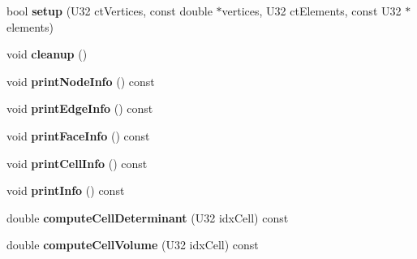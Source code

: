 \begin{DoxyCompactItemize}
\item 
\hypertarget{classps_1_1elastic_1_1VolMesh_a22ec69f1fafb6470f4c86077aa785edc}{}bool {\bfseries setup} (U32 ct\+Vertices, const double $\ast$vertices, U32 ct\+Elements, const U32 $\ast$elements)\label{classps_1_1elastic_1_1VolMesh_a22ec69f1fafb6470f4c86077aa785edc}

\item 
\hypertarget{classps_1_1elastic_1_1VolMesh_ab5e7fad7fda1a51dc0e4f304dd4aa0ce}{}void {\bfseries cleanup} ()\label{classps_1_1elastic_1_1VolMesh_ab5e7fad7fda1a51dc0e4f304dd4aa0ce}

\item 
\hypertarget{classps_1_1elastic_1_1VolMesh_af749229a655b38582d9028c3cfbf394d}{}void {\bfseries print\+Node\+Info} () const \label{classps_1_1elastic_1_1VolMesh_af749229a655b38582d9028c3cfbf394d}

\item 
\hypertarget{classps_1_1elastic_1_1VolMesh_a32ca6c1d68d66f6cb1bde8f753ef24c1}{}void {\bfseries print\+Edge\+Info} () const \label{classps_1_1elastic_1_1VolMesh_a32ca6c1d68d66f6cb1bde8f753ef24c1}

\item 
\hypertarget{classps_1_1elastic_1_1VolMesh_ad22385def9a3182c478ea67c8ae85f37}{}void {\bfseries print\+Face\+Info} () const \label{classps_1_1elastic_1_1VolMesh_ad22385def9a3182c478ea67c8ae85f37}

\item 
\hypertarget{classps_1_1elastic_1_1VolMesh_a8ea54db807acc94c891ef91a677d0a00}{}void {\bfseries print\+Cell\+Info} () const \label{classps_1_1elastic_1_1VolMesh_a8ea54db807acc94c891ef91a677d0a00}

\item 
\hypertarget{classps_1_1elastic_1_1VolMesh_a75d8e756fdd5fcb664e352562ed37082}{}void {\bfseries print\+Info} () const \label{classps_1_1elastic_1_1VolMesh_a75d8e756fdd5fcb664e352562ed37082}

\item 
\hypertarget{classps_1_1elastic_1_1VolMesh_a8d8067f52b058c47f562362b030683e4}{}double {\bfseries compute\+Cell\+Determinant} (U32 idx\+Cell) const \label{classps_1_1elastic_1_1VolMesh_a8d8067f52b058c47f562362b030683e4}

\item 
\hypertarget{classps_1_1elastic_1_1VolMesh_a2322935cc39ca160d81afc85a07bb33d}{}double {\bfseries compute\+Cell\+Volume} (U32 idx\+Cell) const \label{classps_1_1elastic_1_1VolMesh_a2322935cc39ca160d81afc85a07bb33d}


\end{DoxyCompactItemize}
